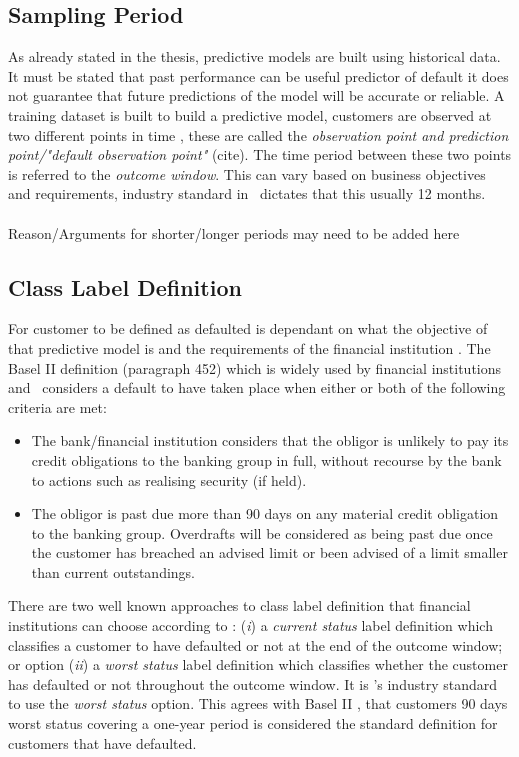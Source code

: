 \subsection{Sampling Period}
As already stated in the thesis, predictive models are built using historical data. It must be stated that past performance can be useful predictor of default it does not guarantee that future predictions of the model will be accurate or reliable. A training dataset is built to build a predictive model, customers are observed at two different points in time \citep{martens_credit_2010}, these are called the \textit{observation point and prediction point/"default observation point"} (cite). The time period between these two points is referred to the \textit{outcome window}. This can vary based on business objectives and requirements, industry standard in \subjectname\ dictates that this usually 12 months. \\\\

Reason/Arguments for shorter/longer periods may need to be added here \\

\subsection{Class Label Definition} \label{classLabelDef}
For customer to be defined as defaulted is dependant on what the objective of that predictive model is and the requirements of the financial institution \citep{mcnab_principles_2000}. The Basel II definition (paragraph 452) which is widely used by financial institutions and \subjectname\ considers a default to have taken place when either or both of the following criteria are met:
\vspace{-3mm} 
\begin{itemize}
	\item The bank/financial institution considers that the obligor is unlikely to pay its credit obligations to the banking group in full, without recourse by the bank to actions such as realising security (if held).
	\item The obligor is past due more than 90 days on any material credit obligation to the banking group. Overdrafts will be considered as being past due once the customer has breached an advised limit or been advised of a limit smaller than current outstandings.
\end{itemize} 

There are two well known approaches to class label definition that financial institutions can choose according to \cite{anderson_credit_2007}: (\textit{i}) a \textit{current status} label definition which classifies a customer to have defaulted or not at the end of the outcome window; or option (\textit{ii}) a \textit{worst status} label definition which classifies whether the customer has defaulted or not throughout the outcome window. It is \subjectname's industry standard to use the \textit{worst status} option. This agrees with Basel II \citep{basel_international_2006}, that customers 90 days worst status covering a one-year period is considered the standard definition for customers that have defaulted. 



